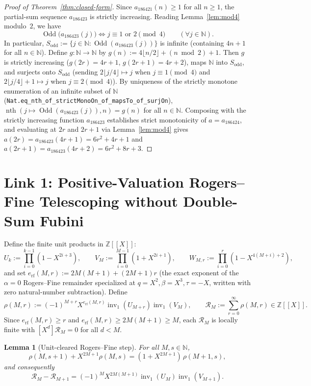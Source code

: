\documentclass[11pt]{article}
\newcommand{\llbracket}{[\![}
\newcommand{\rrbracket}{]\!]}
\newtheorem{lemma}[theorem]{Lemma}
\theoremstyle{definition}
\newcommand{\N}{\mathbb{N}}
\newcommand{\Z}{\mathbb{Z}}
\newcommand{\inv}{\operatorname{inv}_1}
\begin{document}
\begin{proof}[Proof of Theorem~\ref{thm:closed-form}]
Since $a_{186421}(n) \ge 1$ for all $n \ge 1$, the partial-sum sequence $a_{186423}$ is strictly increasing. Reading Lemma~\ref{lem:mod4} modulo~$2$, we have
\[
\operatorname{Odd}\bigl(a_{186423}(j)\bigr) \iff j \equiv 1 \text{ or } 2 \pmod{4} \qquad (\forall j \in \N).
\]
In particular, $S_{\mathrm{odd}} := \{j \in \N : \operatorname{Odd}(a_{186423}(j))\}$ is infinite (containing $4n + 1$ for all $n \in \N$). Define $g : \N \to \N$ by $g(n) := 4\lfloor n/2 \rfloor + (n \bmod 2) + 1$. Then $g$ is strictly increasing ($g(2r) = 4r + 1$, $g(2r + 1) = 4r + 2$), maps $\N$ into $S_{\mathrm{odd}}$, and surjects onto $S_{\mathrm{odd}}$ (sending $2\lfloor j/4 \rfloor \mapsto j$ when $j \equiv 1 \pmod 4$ and $2\lfloor j/4 \rfloor + 1 \mapsto j$ when $j \equiv 2 \pmod 4$). By uniqueness of the strictly monotone enumeration of an infinite subset of $\N$ (\texttt{Nat.eq\_nth\_of\_strictMonoOn\_of\_mapsTo\_of\_surjOn}), $\operatorname{nth}(j \mapsto \operatorname{Odd}(a_{186423}(j)), n) = g(n)$ for all $n \in \N$. Composing with the strictly increasing function $a_{186423}$ establishes strict monotonicity of $a = a_{186424}$, and evaluating at $2r$ and $2r + 1$ via Lemma~\ref{lem:mod4} gives $a(2r) = a_{186423}(4r + 1) = 6r^2 + 4r + 1$ and $a(2r + 1) = a_{186423}(4r + 2) = 6r^2 + 8r + 3$.
\end{proof}

\section{Link 1: Positive-Valuation Rogers--Fine Telescoping without Double-Sum Fubini}

Define the finite unit products in $\Z\llbracket X \rrbracket$:
\[
U_k := \prod_{i=0}^{k-1} (1 - X^{2i+3}), \qquad V_M := \prod_{i=0}^{M-1} (1 + X^{2i+1}), \qquad W_{M,r} := \prod_{i=0}^{r} (1 - X^{4(M + i) + 2}),
\]
and set $e_{\mathrm{rf}}(M, r) := 2M(M + 1) + (2M + 1)r$ (the exact exponent of the $\alpha = 0$ Rogers--Fine remainder specialized at $q = X^2, \beta = X^3, \tau = -X$, written with zero natural-number subtraction). Define
\[
\rho(M, r) := (-1)^{M+r} X^{e_{\mathrm{rf}}(M, r)} \inv(U_{M+r}) \inv(V_M),
\qquad \mathcal{R}_M := \sum_{r=0}^{\infty} \rho(M, r) \in \Z\llbracket X \rrbracket.
\]
Since $e_{\mathrm{rf}}(M, r) \ge r$ and $e_{\mathrm{rf}}(M, r) \ge 2M(M + 1) \ge M$, each $\mathcal{R}_M$ is locally finite with $[X^d] \mathcal{R}_M = 0$ for all $d < M$.

\begin{lemma}[Unit-cleared Rogers--Fine step]
\label{lem:rf-step}
For all $M, s \in \N$,
\begin{equation}
\label{eq:rf-term}
\rho(M, s + 1) + X^{2M+1} \rho(M, s) = (1 + X^{2M+1})\, \rho(M + 1, s),
\end{equation}
and consequently
\begin{equation}
\label{eq:rf-diff}
\mathcal{R}_M - \mathcal{R}_{M+1} = (-1)^M X^{2M(M+1)} \inv(U_M) \inv(V_{M+1}).
\end{equation}
\end{lemma}
\end{document}
